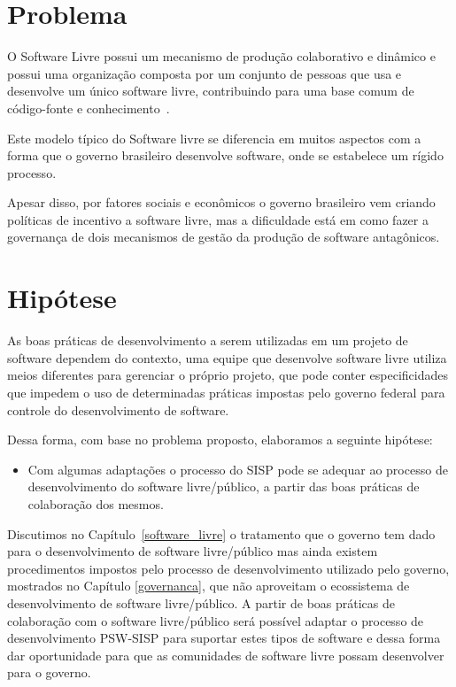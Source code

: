 \section{Problema}

O Software Livre possui um mecanismo de produção colaborativo e dinâmico 
e possui uma organização composta por um conjunto de pessoas que usa e desenvolve 
um único software livre, contribuindo para uma base comum de código-fonte e 
conhecimento~\cite{reis2003caracterizacc}.

Este modelo típico do Software livre se diferencia em muitos aspectos com a forma
que o governo brasileiro desenvolve software, onde se estabelece um rígido processo.

Apesar disso, por fatores sociais e econômicos o governo brasileiro vem
criando políticas de incentivo a software livre, mas a dificuldade está em como
fazer a governança de dois mecanismos de gestão da produção de software antagônicos. 

\section{Hipótese}

As boas práticas de desenvolvimento a serem utilizadas em um projeto de software 
dependem do contexto, uma equipe que desenvolve software livre utiliza
meios diferentes para gerenciar o próprio projeto, que pode conter especificidades 
que impedem o uso de determinadas práticas impostas pelo governo federal para controle
do desenvolvimento de software. 

Dessa forma, com base no problema proposto, elaboramos a seguinte hipótese:

\begin{itemize}
\item Com algumas adaptações o processo do SISP pode se adequar
ao processo de desenvolvimento do software livre/público, a partir das boas práticas 
de colaboração dos mesmos.
\end{itemize}

Discutimos no Capítulo~\ref{software_livre} o tratamento que o governo
tem dado para o desenvolvimento de software livre/público mas ainda existem procedimentos
impostos pelo processo de desenvolvimento utilizado pelo governo, mostrados no Capítulo
\ref{governanca}, que não aproveitam o ecossistema de desenvolvimento de software livre/público.
%
A partir de boas práticas de colaboração com o software livre/público será possível
adaptar o processo de desenvolvimento PSW-SISP para suportar estes tipos de software e 
dessa forma dar oportunidade para que as comunidades de software livre possam desenvolver 
para o governo. 


